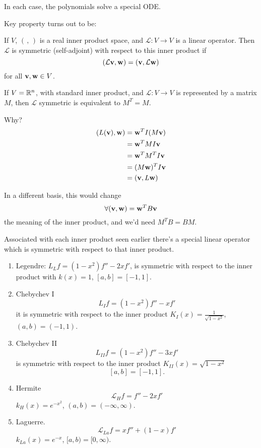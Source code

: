 \documentclass[10pt, a4paper]{article}
\begin{document}
In each case,
the polynomials solve a special ODE.

Key property turns out to be:

\begin{definition}
    If $V$,
    $(\,,\,)$ is a real inner product space,
    and $\mathcal{L} : V \rightarrow V$ is a linear operator.
    Then $\mathcal{L}$ is symmetric
    (self-adjoint)
    with respect to this inner product if
    \[
    (\mathcal{L}\mathbf{v}, \mathbf{w}) = (\mathbf{v}, \mathcal{L}\mathbf{w})
    \]
    for all $\mathbf{v}, \mathbf{w} \in V$.
\end{definition}

\begin{example}
    If $V = \mathbb{R} ^ n$,
    with standard inner product,
    and $\mathcal{L} : V \rightarrow V$ is represented by a matrix $M$,
    then $\mathcal{L}$ symmetric is equivalent to $M ^ T = M$.

    Why?
    \begin{align*}
        (L(\mathbf{v}), \mathbf{w}) &= \mathbf{w} ^ TI(M\mathbf{v}) \\
        &= \mathbf{w} ^ TMI\mathbf{v} \\
        &= \mathbf{w} ^ TM ^ TI\mathbf{v} \\
        &= (M\mathbf{w}) ^ TI\mathbf{v} \\
        &= (\mathbf{v}, L\mathbf{w})
    \end{align*}
\end{example}

In a different basis,
this would change
\[
\forall (\mathbf{v}, \mathbf{w}) = \mathbf{w} ^ TB\mathbf{v}
\]
the meaning of the inner product,
and we'd need $M ^ TB = BM$.

Associated with each inner product seen earlier there's a special linear operator which is symmetric with respect to that inner product.

\begin{enumerate}[label = (\roman*)]
    \item 
    Legendre:
    $L_Lf = (1 - x ^ 2)f'' - 2xf'$,
    is symmetric with respect to the inner product with $k(x) = 1$,
    $[a, b] = [-1, 1]$.

    \item Chebychev I
    \[
    L_I f = (1 - x ^ 2)f'' - xf'
    \]
    it is symmetric with respect to the inner product $K_I(x) = \frac{1}{\sqrt{1 - x ^ 2}}$,
    $(a, b) = (-1, 1)$.

    \item Chebychev II
    \[
    L_{II} f = (1 - x ^ 2)f'' - 3xf'
    \]
    is symmetric with respect to the inner product $K_{II}(x) = \sqrt{1 - x ^ 2}$
    \[
    [a, b] = [-1, 1].
    \]

    \item Hermite
    \[
    \mathcal{L}_Hf = f'' - 2xf'
    \]
    $k_H(x) = e ^ {-x ^ 2}$,
    $(a, b) = (-\infty, \infty)$.

    \item Laguerre.
    \[
    \mathcal{L}_{La}f = xf'' + (1 - x)f'
    \]
    $k_{La}(x) = e ^ {-x}$,
    $[a, b) = [0, \infty)$.
\end{enumerate}
\end{document}
